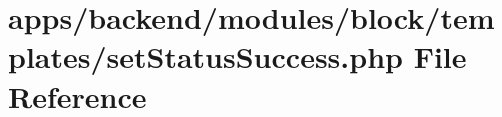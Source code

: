 \hypertarget{block_2templates_2set_status_success_8php}{\section{apps/backend/modules/block/templates/set\-Status\-Success.php File Reference}
\label{block_2templates_2set_status_success_8php}
}
